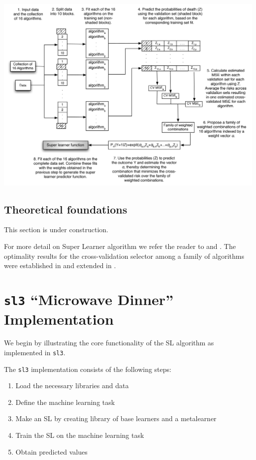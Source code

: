 \documentclass[
  12pt, krantz2,
]{krantz}
\newcommand{\passthrough}[1]{#1}
\providecommand{\tightlist}{%
  \setlength{\itemsep}{0pt}\setlength{\parskip}{0pt}}
\newcommand{\1}{\mathbbm{1}}
\theoremstyle{definition}
\theoremstyle{definition}
\theoremstyle{definition}
\theoremstyle{definition}
\theoremstyle{remark}
\begin{document}
\begin{center}\includegraphics[width=0.8\linewidth]{img/png/SLKaiserNew} \end{center}

\hypertarget{sl3-theory}{%
\subsection{Theoretical foundations}\label{sl3-theory}}

This section is under construction.

For more detail on Super Learner algorithm we refer the reader to
\citet{polley2010super} and \citet{vdl2007super}. The optimality results for the
cross-validation selector among a family of algorithms were established in
\citet{vdl2003unified} and extended in \citet{vaart2006oracle}.

\hypertarget{sl3-microwave-dinner-implementation}{%
\section*{\texorpdfstring{\texttt{sl3} ``Microwave Dinner'' Implementation}{sl3 ``Microwave Dinner'' Implementation}}\label{sl3-microwave-dinner-implementation}}


We begin by illustrating the core functionality of the SL algorithm as
implemented in \passthrough{\lstinline!sl3!}.

The \passthrough{\lstinline!sl3!} implementation consists of the following steps:

\begin{enumerate}
\def\labelenumi{\arabic{enumi}.}
\setcounter{enumi}{-1}
\tightlist
\item
  Load the necessary libraries and data
\item
  Define the machine learning task
\item
  Make an SL by creating library of base learners and a metalearner
\item
  Train the SL on the machine learning task
\item
  Obtain predicted values
\end{enumerate}
\end{document}
